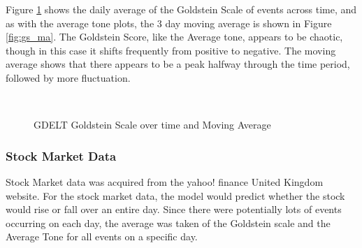  Figure \ref{fig:gs_diff} shows the daily average of the Goldstein Scale of events across time, and as with the average tone plots, the 3 day moving average is shown in Figure \ref{fig:gs_ma}. The Goldstein Score, like the Average tone, appears to be chaotic, though in this case it shifts frequently from positive to negative. The moving average shows that there appears to be a peak halfway through the time period, followed by more fluctuation. 
 
 \begin{figure}[H]
 	\centering
 	\\
 	\caption{GDELT Goldstein Scale over time and Moving Average}
 	\label{fig:gs_diff}
 \end{figure}
 
 
\subsubsection{Stock Market Data}
Stock Market data was acquired from the yahoo! finance United Kingdom website. For the stock market data, the model would predict whether the stock would rise or fall over an entire day. Since there were potentially lots of events occurring on each day, the average was taken of the Goldstein scale and the Average Tone for all events on a specific day. 

